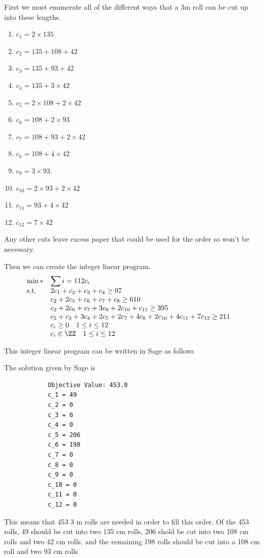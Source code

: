 \documentclass[11pt, oneside]{article}
\begin{document}
\begin{enumerate}
        First we must enumerate all of the different ways that a 3m roll can be
        cut up into these lengths.
        \begin{enumerate}
            \item $c_1 = 2 \times 135$
            \item $c_2 = 135 + 108 + 42$
            \item $c_3 = 135 + 93 + 42$
            \item $c_4 = 135 + 3 \times 42$
            \item $c_5 = 2 \times 108 + 2 \times 42$
            \item $c_6 = 108 + 2 \times 93$
            \item $c_7 = 108 + 93 + 2 \times 42$
            \item $c_8 = 108 + 4 \times 42$
            \item $c_9 = 3 \times 93$.
            \item $c_{10} = 2 \times 93 + 2 \times 42$
            \item $c_{11} = 93 + 4 \times 42$
            \item $c_{12} = 7 \times 42$
        \end{enumerate}
        Any other cuts leave excess paper that could be used for the order so
        won't be necessary.

        Then we can create the integer linear program.
        \[
            \begin{array}{ll@{}ll}
                \min* & \displaystyle\sum{i = 1}{12}{c_i} & & \\
                \text{s.t.} & 2c_1 + c_2 + c_3 + c_4 \ge 97 \\
                & c_2 + 2c_5 + c_6 + c_7 + c_8 \ge 610 \\
                & c_3 + 2 c_6 + c_7 + 3c_9 + 2c_{10} + c_{11} \ge 395 \\
                & c_2 + c_3 + 3c_4 + 2c_5 + 2c_7 + 4c_8 + 2c_{10} + 4c_{11} + 7c_{12} \ge 211 \\
                & c_i \ge 0 \quad 1 \le i \le 12 \\
                & c_i \in \ZZ \quad 1 \le i \le 12
            \end{array}
        \]

        This integer linear program can be written in Sage as follows
        

        The solution given by Sage is
        \begin{verbatim}
            Objective Value: 453.0
            c_1 = 49
            c_2 = 0
            c_3 = 0
            c_4 = 0
            c_5 = 206
            c_6 = 198
            c_7 = 0
            c_8 = 0
            c_9 = 0
            c_10 = 0
            c_11 = 0
            c_12 = 0
        \end{verbatim}

        This means that 453 3 m rolls are needed in order to fill this order.
        Of the 453 rolls, 49 should be cut into two 135 cm rolls, 206 shold be
        cut into two 108 cm rolls and two 42 cm rolls, and the remaining 198
        rolls should be cut into a 108 cm roll and two 93 cm rolls
\end{enumerate}
\end{document}
